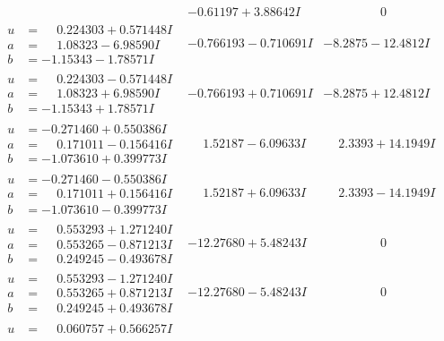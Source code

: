 \documentclass[1p]{elsarticle_modified}
\theoremstyle{definition}
\begin{document}
$$\begin{array}{c|c|c}
 & -0.61197 + 3.88642 I & \phantom{-0.000000 } 0 \\ \hline\begin{aligned}
u &= \phantom{-}0.224303 + 0.571448 I \\
a &= \phantom{-}1.08323 - 6.98590 I \\
b &= -1.15343 - 1.78571 I\end{aligned}
 & -0.766193 - 0.710691 I & -8.2875 - 12.4812 I \\ \hline\begin{aligned}
u &= \phantom{-}0.224303 - 0.571448 I \\
a &= \phantom{-}1.08323 + 6.98590 I \\
b &= -1.15343 + 1.78571 I\end{aligned}
 & -0.766193 + 0.710691 I & -8.2875 + 12.4812 I \\ \hline\begin{aligned}
u &= -0.271460 + 0.550386 I \\
a &= \phantom{-}0.171011 - 0.156416 I \\
b &= -1.073610 + 0.399773 I\end{aligned}
 & \phantom{-}1.52187 - 6.09633 I & \phantom{-}2.3393 + 14.1949 I \\ \hline\begin{aligned}
u &= -0.271460 - 0.550386 I \\
a &= \phantom{-}0.171011 + 0.156416 I \\
b &= -1.073610 - 0.399773 I\end{aligned}
 & \phantom{-}1.52187 + 6.09633 I & \phantom{-}2.3393 - 14.1949 I \\ \hline\begin{aligned}
u &= \phantom{-}0.553293 + 1.271240 I \\
a &= \phantom{-}0.553265 - 0.871213 I \\
b &= \phantom{-}0.249245 - 0.493678 I\end{aligned}
 & -12.27680 + 5.48243 I & \phantom{-0.000000 } 0 \\ \hline\begin{aligned}
u &= \phantom{-}0.553293 - 1.271240 I \\
a &= \phantom{-}0.553265 + 0.871213 I \\
b &= \phantom{-}0.249245 + 0.493678 I\end{aligned}
 & -12.27680 - 5.48243 I & \phantom{-0.000000 } 0 \\ \hline\begin{aligned}
u &= \phantom{-}0.060757 + 0.566257 I \\

\end{aligned}
\end{array}$$
\end{document}
